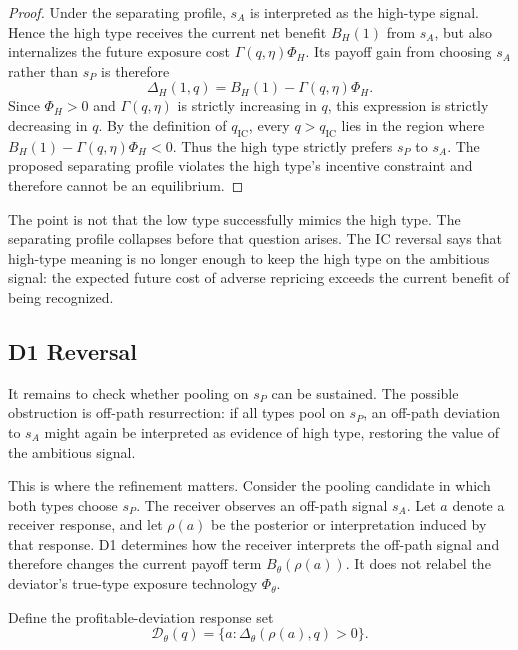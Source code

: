 \begin{proof}
Under the separating profile, \(s_A\) is interpreted as the high-type signal. Hence the high type receives the current net benefit \(B_H(1)\) from \(s_A\), but also internalizes the future exposure cost \(\Gamma(q,\eta)\Phi_H\). Its payoff gain from choosing \(s_A\) rather than \(s_P\) is therefore
\[
\Delta_H(1,q)=B_H(1)-\Gamma(q,\eta)\Phi_H.
\]
Since \(\Phi_H>0\) and \(\Gamma(q,\eta)\) is strictly increasing in \(q\), this expression is strictly decreasing in \(q\). By the definition of \(q_{\mathrm{IC}}\), every \(q>q_{\mathrm{IC}}\) lies in the region where \(B_H(1)-\Gamma(q,\eta)\Phi_H<0\). Thus the high type strictly prefers \(s_P\) to \(s_A\). The proposed separating profile violates the high type's incentive constraint and therefore cannot be an equilibrium.
\end{proof}

The point is not that the low type successfully mimics the high type. The separating profile collapses before that question arises. The IC reversal says that high-type meaning is no longer enough to keep the high type on the ambitious signal: the expected future cost of adverse repricing exceeds the current benefit of being recognized.

\subsection{D1 Reversal}
\label{subsec:d1-reversal}
\label{subsec:d1-off-path-reversal}

It remains to check whether pooling on \(s_P\) can be sustained. The possible obstruction is off-path resurrection: if all types pool on \(s_P\), an off-path deviation to \(s_A\) might again be interpreted as evidence of high type, restoring the value of the ambitious signal.

This is where the refinement matters. Consider the pooling candidate in which both types choose \(s_P\). The receiver observes an off-path signal \(s_A\). Let \(a\) denote a receiver response, and let \(\rho(a)\) be the posterior or interpretation induced by that response. D1 determines how the receiver interprets the off-path signal and therefore changes the current payoff term \(B_\theta(\rho(a))\). It does not relabel the deviator's true-type exposure technology \(\Phi_\theta\).

Define the profitable-deviation response set
\[
\mathcal D_\theta(q)=\{a:\Delta_\theta(\rho(a),q)>0\}.
\]

